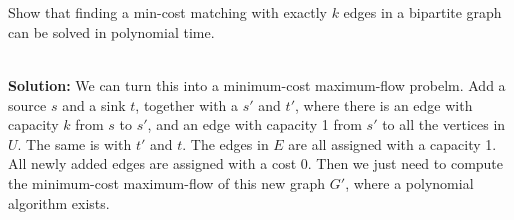 \section{}
Show that finding a min-cost matching with exactly $k$ edges in a bipartite graph can be solved in polynomial time.

\ \\{\bf Solution:} We can turn this into a minimum-cost maximum-flow probelm. Add a source $s$ and a sink $t$, together with a $s'$ and $t'$, where there is an edge with capacity $k$ from $s$ to $s'$, and an edge with capacity 1 from $s'$ to all the vertices in $U$. The same is with $t'$ and $t$. The edges in $E$ are all assigned with a capacity 1. All newly added edges are assigned with a cost 0. Then we just need to compute the minimum-cost maximum-flow of this new graph $G'$, where a polynomial algorithm exists.